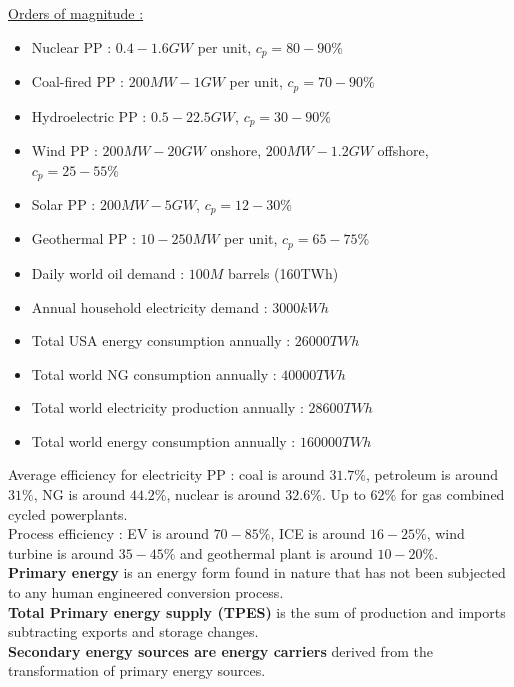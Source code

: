 \documentclass[../main.tex]{subfiles}
\begin{document}
\quad \underline{Orders of magnitude :}\\
\begin{itemize}
    \item Nuclear PP : $0.4-1.6GW$ per unit, $c_p = 80-90\%$
    \item Coal-fired PP : $200MW-1GW$ per unit, $c_p = 70-90\%$
    \item Hydroelectric PP : $0.5-22.5GW$, $c_p = 30-90\%$
    \item Wind PP : $200MW-20GW$ onshore, $200MW-1.2GW$ offshore, $c_p = 25-55\%$
    \item Solar PP : $200MW-5GW$, $c_p = 12-30\%$
    \item Geothermal PP : $10-250MW$ per unit, $c_p = 65-75\%$
    \item Daily world oil demand : $100M$ barrels (160TWh)
    \item Annual household electricity demand : $3000 kWh$
    \item Total USA energy consumption annually : $26 000TWh$
    \item Total world NG consumption annually : $40 000TWh$
    \item Total world electricity production annually : $28600 TWh$
    \item Total world energy consumption annually : $160 000 TWh$
\end{itemize}

Average efficiency for electricity PP : coal is around $31.7\%$, petroleum is around $31\%$, NG is around $44.2\%$, nuclear is around $32.6\%$. Up to $62\%$ for gas combined cycled powerplants.\\
Process efficiency : EV is around $70-85\%$, ICE is around $16-25\%$, wind turbine is around $35-45\%$ and geothermal plant is around $10-20\%$.\\

\textbf{Primary energy} is an energy form found in nature that has not been subjected to any human engineered conversion process. \\
\textbf{Total Primary energy supply (TPES)} is the sum of production and imports subtracting exports and storage changes.\\
\textbf{Secondary energy sources are energy carriers } derived from the transformation of primary energy sources.\\
\end{document}
